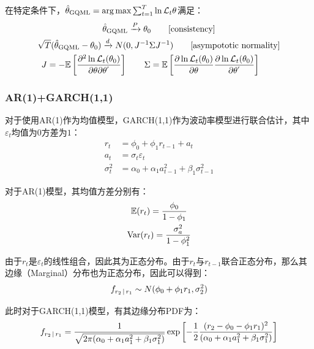\documentclass[11pt]{article}
\begin{document}
在特定条件下，$\hat{\theta}_{\text{GQML}} = \arg \max \sum_{t=1}^{T} \ln \mathcal{L}_t{\theta}$满足：
\begin{gather*}
    \hat{\theta}_{\text{GQML}} \xrightarrow{P} \theta_0 \qquad \text{[consistency]}\\
    \sqrt{T}(\hat{\theta}_{\text{GQML}}-\theta_0) \xrightarrow{d} N(0,J^{-1}\Sigma J^{-1}) \qquad\text{[asympototic normality]} \\
    J = -\mathbb{E}\left[ \frac{\partial^2 \ln \mathcal{L}_t(\theta_0)}{\partial \theta \partial \theta^{'}} \right] \qquad
    \Sigma = \mathbb{E}\left[ \frac{\partial \ln \mathcal{L}_t(\theta_0)}{\partial \theta} \frac{\partial \ln \mathcal{L}_t(\theta_0)}{\partial \theta^{'}} \right] \qquad
\end{gather*}

\subsubsection{AR(1)+GARCH(1,1)}

对于使用AR(1)作为均值模型，GARCH(1,1)作为波动率模型进行联合估计，其中$\varepsilon_t$均值为$0$方差为$1$：
\begin{align*}
    r_t &= \phi_0 + \phi_1 r_{t-1} + a_t \\
    a_t &= \sigma_t \varepsilon_t \\
    \sigma_t^2 &= \alpha_0 + \alpha_1 a_{t-1}^{2} + \beta_1 \sigma_{t-1}^{2}
\end{align*}

对于AR(1)模型，其均值方差分别有：
\begin{gather*}
    \mathbb{E}(r_t) = \frac{\phi_0}{1-\phi_1} \\
    \operatorname{Var}(r_t) = \frac{\sigma_{a}^2}{1-\phi_1^2}
\end{gather*}

由于$r_t$是$\varepsilon_t$的线性组合，因此其为正态分布。由于$r_t$与$r_{t-1}$联合正态分布，那么其边缘（Marginal）分布也为正态分布，因此可以得到：
\begin{equation*}
    f_{r_2 \,\vert\, r_1} \sim N(\phi_0 + \phi_1 r_1,\sigma_{2}^{2})
\end{equation*}

此时对于GARCH(1,1)模型，有其边缘分布PDF为：
\begin{equation*}
    f_{r_2 \,\vert\, r_1} = \frac{1}{\sqrt{2\pi(\alpha_0 + \alpha_1 a_{1}^{2} + \beta_1 \sigma_{1}^{2})}} \exp \left[ -\frac{1}{2} \frac{(r_2 - \phi_0 -\phi_1 r_1)^2}{(\alpha_0 + \alpha_1 a_{1}^{2} + \beta_1 \sigma_{1}^{2})} \right]
\end{equation*}
\end{document}
